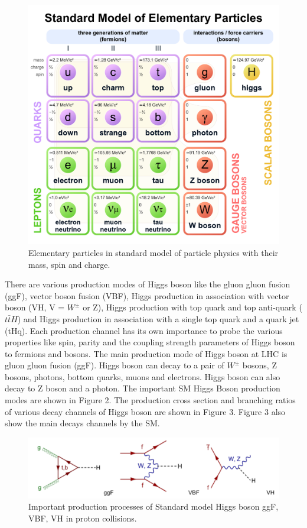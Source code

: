 \documentclass[final,3p]{CSP}
\begin{document}
\begin{figure}[H]
	\centering
	\includegraphics[width= 0.5 \columnwidth]{./sm.png}
	\caption{Elementary particles in standard model of particle physics with their mass, spin and charge.}
	\label{figure 1}
\end{figure}


There are various production modes of Higgs boson like the gluon gluon fusion (ggF), vector boson fusion (VBF), Higgs 
production in association with vector boson (VH, V = $W^{\pm}$ or Z), Higgs production with top quark and top anti-quark ($t\bar{t}H$) and Higgs 
production in association with a single top quark and a quark jet (tHq). Each production channel has its own importance to probe the 
various properties like spin, parity and the coupling strength parameters of Higgs boson to fermions and bosons. The main production mode of Higgs boson at LHC is 
gluon gluon fusion (ggF). Higgs boson can decay to a pair of $W^{\pm}$ bosons, Z bosons, photons, bottom quarks, 
muons and electrons. Higgs boson can also decay to Z boson and a photon. The important SM Higgs Boson production modes are shown in Figure 2. The production cross section and branching ratios of various decay channels of Higgs boson are shown in Figure 3.
Figure 3 also show the main decays channels by the SM.

\begin{figure}[H]
	\centering
	\includegraphics[width=\columnwidth]{./production_mode.png}
	\caption{Important production processes of Standard model Higgs boson ggF, VBF, VH in proton collisions.}
	\label{figure 2}
\end{figure}
\end{document}
